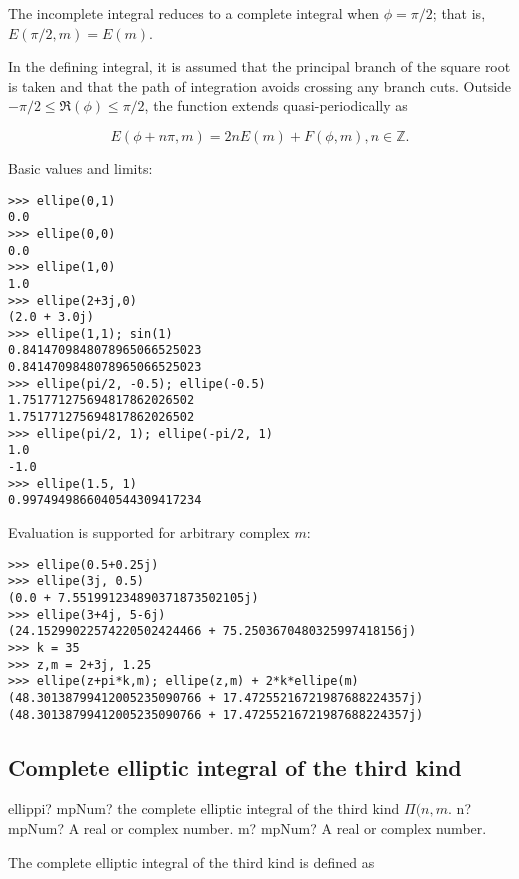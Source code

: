 The incomplete integral reduces to a complete integral when $\phi=\pi/2$; that is, $E(\pi/2,m) = E(m)$.

In the defining integral, it is assumed that the principal branch of the square root is taken and that the path of integration avoids crossing any branch cuts. Outside $-\pi/2 \leq \Re(\phi) \leq \pi/2$, the function extends quasi-periodically as

\begin{equation}
E(\phi+n\pi,m) = 2nE(m) + F(\phi,m), n \in \mathbb{Z}.
\end{equation}


Basic values and limits:

\begin{lstlisting}
>>> ellipe(0,1)
0.0
>>> ellipe(0,0)
0.0
>>> ellipe(1,0)
1.0
>>> ellipe(2+3j,0)
(2.0 + 3.0j)
>>> ellipe(1,1); sin(1)
0.8414709848078965066525023
0.8414709848078965066525023
>>> ellipe(pi/2, -0.5); ellipe(-0.5)
1.751771275694817862026502
1.751771275694817862026502
>>> ellipe(pi/2, 1); ellipe(-pi/2, 1)
1.0
-1.0
>>> ellipe(1.5, 1)
0.9974949866040544309417234
\end{lstlisting}

Evaluation is supported for arbitrary complex $m$:

\begin{lstlisting}
>>> ellipe(0.5+0.25j)
>>> ellipe(3j, 0.5)
(0.0 + 7.551991234890371873502105j)
>>> ellipe(3+4j, 5-6j)
(24.15299022574220502424466 + 75.2503670480325997418156j)
>>> k = 35
>>> z,m = 2+3j, 1.25
>>> ellipe(z+pi*k,m); ellipe(z,m) + 2*k*ellipe(m)
(48.30138799412005235090766 + 17.47255216721987688224357j)
(48.30138799412005235090766 + 17.47255216721987688224357j)
\end{lstlisting}




\subsection{Complete elliptic integral of the third kind}

\begin{mpFunctionsExtract}
	\mpFunctionTwo
	{ellippi? mpNum? the complete elliptic integral of the third kind $\Pi(n,m$.}
	{n? mpNum? A real or complex number.}
	{m? mpNum? A real or complex number.}	
\end{mpFunctionsExtract}


The complete elliptic integral of the third kind is defined as

